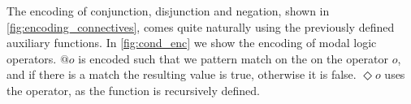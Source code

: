 \documentclass[sigplan,anonymous,review]{acmart}
\begin{document}
The encoding of conjunction, disjunction and negation, shown in \cref{fig:encoding_connectives}, comes quite naturally using the previously defined auxiliary functions.
In \cref{fig:cond_enc} we show the encoding of modal logic operators.
$@o$ is encoded such that we pattern match on the on the operator $o$, and if there is a match the resulting value is true, otherwise it is false. $\Diamond o$ uses the \fix operator, as the function is recursively defined. 
\end{document}
